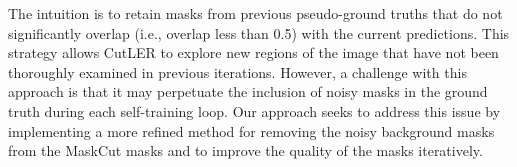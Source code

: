 The intuition is to retain masks from previous pseudo-ground truths that do not significantly overlap (i.e., overlap less than 0.5) with the current predictions. This strategy allows CutLER to explore new regions of the image that have not been thoroughly examined in previous iterations. However, a challenge with this approach is that it may perpetuate the inclusion of noisy masks in the ground truth during each self-training loop. Our approach seeks to address this issue by implementing a more refined method for removing the noisy background masks from the MaskCut masks and to improve the quality of the masks iteratively.
